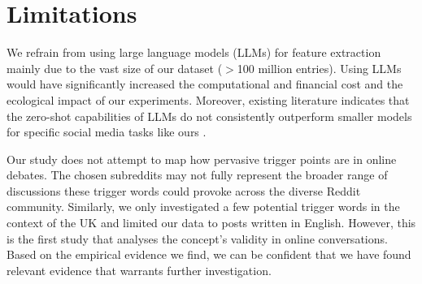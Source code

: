 \section{Limitations}
We refrain from using large language models (LLMs) for feature extraction mainly due to the vast size of our dataset ($>$100 million entries). Using LLMs would have significantly increased the computational and financial cost and the ecological impact of our experiments. Moreover, existing literature indicates that the zero-shot capabilities of LLMs do not consistently outperform smaller models for specific social media tasks like ours \cite{antypas-etal-2023-supertweeteval}.

Our study does not attempt to map how pervasive trigger points are in online debates. The chosen subreddits may not fully represent the broader range of discussions these trigger words could provoke across the diverse Reddit community. Similarly, we only investigated a few potential trigger words in the context of the UK and limited our data to posts written in English. However, this is the first study that analyses the concept's validity in online conversations. Based on the empirical evidence we find, we can be confident that we have found relevant evidence that warrants further investigation. 


